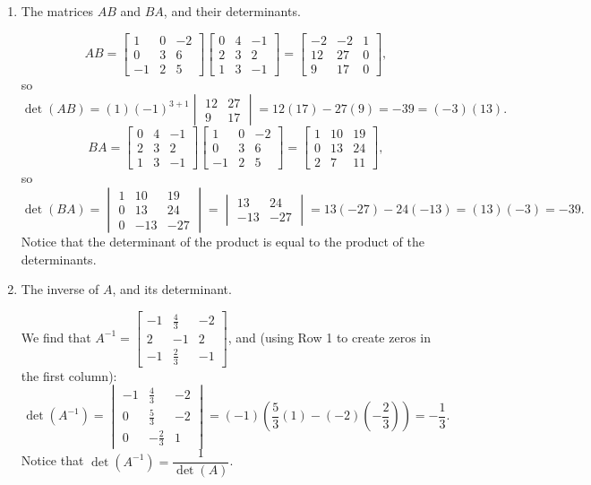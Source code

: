 \documentclass[12pt]{article}
\newcommand{\bbm}{\begin{bmatrix}}
\newcommand{\ebm}{\end{bmatrix}}
\newcommand{\bvm}{\begin{vmatrix}}
\newcommand{\evm}{\end{vmatrix}}
\begin{document}
\begin{enumerate}
\begin{enumerate}
 \item The matrices $AB$ and $BA$, and their determinants.

\[
 AB = \bbm 1&0&-2\\0&3&6\\-1&2&5\ebm\bbm 0&4&-1\\2&3&2\\1&3&-1\ebm=\bbm -2&-2&1\\12&27&0\\9&17&0\ebm,
\]
so
\[
 \det(AB) = (1)(-1)^{3+1}\bvm 12&27\\9&17\evm = 12(17)-27(9) = -39 = (-3)(13).
\]
\newpage
\[
 BA = \bbm 0&4&-1\\2&3&2\\1&3&-1\ebm\bbm 1&0&-2\\0&3&6\\-1&2&5\ebm=\bbm 1&10&19\\0&13&24\\2&7&11\ebm,
\]
so
\[
 \det(BA) = \bvm 1&10&19\\0&13&24\\0&-13&-27\evm = \bvm 13&24\\-13&-27\evm = 13(-27)-24(-13) = (13)(-3)=-39.
\]
Notice that the determinant of the product is equal to the product of the determinants.


 \item The inverse of $A$, and its determinant.

\medskip

We find that $A^{-1} = \bbm -1&\frac{4}{3}&-2\\2&-1&2\\-1&\frac{2}{3}&-1\ebm$, and (using Row 1 to create zeros in the first column):
\[
 \det(A^{-1}) = \bvm -1&\frac{4}{3}&-2\\0&\frac{5}{3}&-2\\0&-\frac{2}{3}&1\evm = (-1)\left(\frac{5}{3}(1)-(-2)\left(-\frac{2}{3}\right)\right) = -\frac{1}{3}.
\]
Notice that $\det(A^{-1}) = \dfrac{1}{\det(A)}$.

\end{enumerate}


 \end{enumerate}
\end{document}
